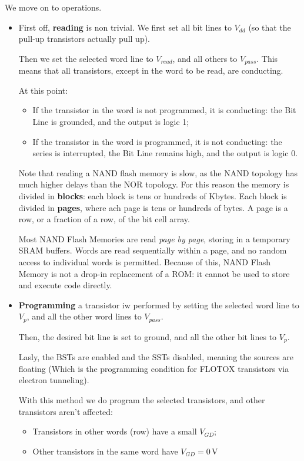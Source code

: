 \documentclass[a4paper,11pt]{article}
\begin{document}
We move on to operations.
\begin{itemize}
	\item First off, \textbf{reading} is non trivial. We first set all bit lines to $V_{dd}$ (so that the pull-up transistors actually pull up).

	      Then we set the selected word line to $V_{read}$, and all others to $V_{pass}$.
	      This means that all transistors, except in the word to be read, are conducting.

	      At this point:
	      \begin{itemize}
		      \item If the transistor in the word is not programmed, it is conducting: the Bit Line is grounded, and the output is logic 1;
		      \item If the transistor in the word is programmed, it is not conducting: the series is interrupted, the Bit Line remains high, and the output is logic 0.
	      \end{itemize}

	      Note that reading a NAND flash memory is slow, as the NAND topology has much higher delays than the NOR topology.
	      For this reason the memory is divided in \textbf{blocks}: each block is tens or hundreds of Kbytes. Each block is divided in \textbf{pages}, where ach page is tens or hundreds of bytes. A page is a row, or a fraction of a row, of the bit cell array.

	      Most NAND Flash Memories are read \textit{page by page}, storing in a temporary SRAM buffers. Words are read sequentially within a page, and no random access to individual words is permitted.
	      Because of this, NAND Flash Memory is not a drop-in replacement of a ROM: it cannot be used to store and execute code directly.

	\item \textbf{Programming} a transistor iw performed by setting the selected word line to $V_p$, and all the other word lines to $V_{pass}$.

	      Then, the desired bit line is set to ground, and all the other bit lines to $V_p$.

	      Lasly, the BSTs are enabled and the SSTs disabled, meaning the sources are floating (Which is the programming condition for FLOTOX transistors via electron tunneling).

	      With this method we do program the selected transistors, and other transistors aren't affected:
	      \begin{itemize}
		      \item Transistors in other words (row) have a small $V_{GD}$;
		      \item Other transistors in the same word have $V_{GD} = 0 \, \mathrm{V}$
	      \end{itemize}


\end{itemize}
\end{document}

